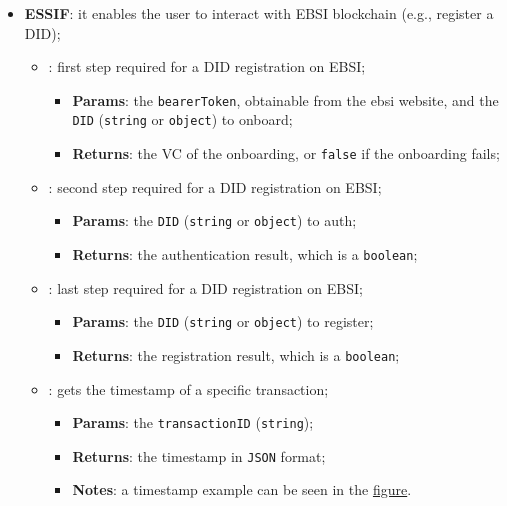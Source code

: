 \begin{itemize}
    \item \textbf{ESSIF}: it enables the user to interact with EBSI blockchain (e.g.,
    register a DID);
    \begin{itemize}
        \setlength{\itemsep}{0.4cm}
        \item[] : first step required for a DID registration on EBSI;
        \begin{itemize}
            \item \textbf{Params}: the \texttt{bearerToken}, obtainable from the ebsi
            website, and the \texttt{DID} (\texttt{string} or \texttt{object}) to onboard;
            \item \textbf{Returns}: the VC of the onboarding, or \texttt{false} if the
            onboarding fails;
        \end{itemize}
        \item[] : second step required for a DID registration on EBSI;
        \begin{itemize}
            \item \textbf{Params}: the \texttt{DID} (\texttt{string} or \texttt{object}) to auth;
            \item \textbf{Returns}: the authentication result, which is a \texttt{boolean};
        \end{itemize}
        \item[] : last step required for a DID registration on EBSI;
        \begin{itemize}
            \item \textbf{Params}: the \texttt{DID} (\texttt{string} or \texttt{object}) to register;
            \item \textbf{Returns}: the registration result, which is a \texttt{boolean};
        \end{itemize}
        \item[] : gets the timestamp of a specific transaction;
        \begin{itemize}
            \item \textbf{Params}: the \texttt{transactionID} (\texttt{string});
            \item \textbf{Returns}: the timestamp in \texttt{JSON} format;
            \item \textbf{Notes}: a timestamp example can be seen in the 
            \hyperref[fig:timestamp]{figure}.
        \end{itemize}
        \begin{center}

\end{center}
\end{itemize}
\end{itemize}
